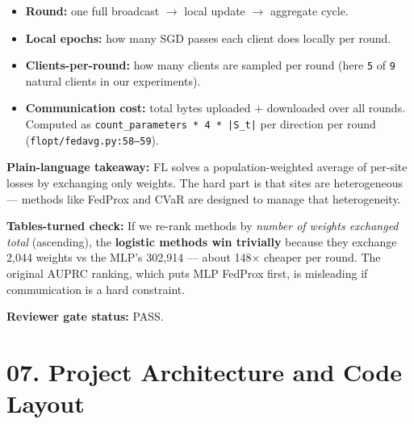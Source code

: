 \documentclass{article}
\begin{document}
\begin{itemize}[leftmargin=1.4em,itemsep=2pt,topsep=2pt]
  \item \textbf{Round:} one full broadcast \ensuremath{\rightarrow} local update \ensuremath{\rightarrow} aggregate cycle.
  \item \textbf{Local epochs:} how many SGD passes each client does locally per round.
  \item \textbf{Clients-per-round:} how many clients are sampled per round (here \texttt{5} of \texttt{9} natural clients in our experiments).
  \item \textbf{Communication cost:} total bytes uploaded + downloaded over all rounds. Computed as \texttt{count\_parameters * 4 * |S\_t|} per direction per round (\texttt{flopt/fedavg.py:58--59}).
\end{itemize}


\textbf{Plain-language takeaway:} FL solves a population-weighted average of per-site losses by exchanging only weights. The hard part is that sites are heterogeneous --- methods like FedProx and CVaR are designed to manage that heterogeneity.


\textbf{Tables-turned check:} If we re-rank methods by \emph{number of weights exchanged total} (ascending), the \textbf{logistic methods win trivially} because they exchange 2,044 weights vs the MLP's 302,914 --- about 148\ensuremath{\times} cheaper per round. The original AUPRC ranking, which puts MLP FedProx first, is misleading if communication is a hard constraint.


\textbf{Reviewer gate status:} PASS.



\clearpage
\section{07. Project Architecture and Code Layout}
\end{document}
